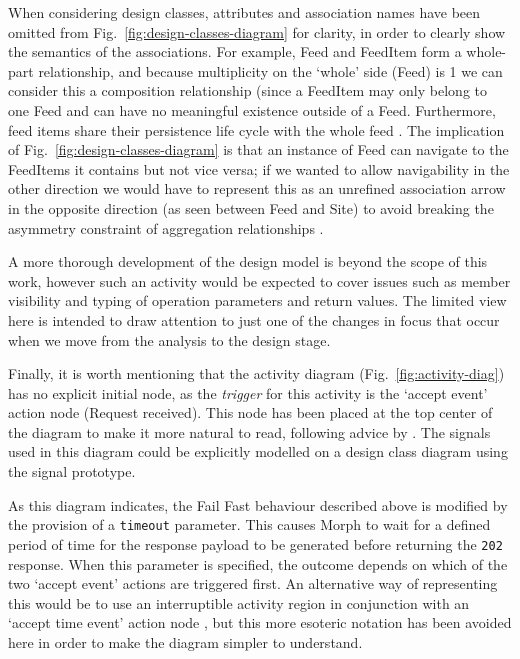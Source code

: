 \documentclass[runningheads,a4paper]{llncs}
\begin{document}
When considering design classes, attributes and association names have been omitted from Fig.~\ref{fig:design-classes-diagram} for clarity, in order to clearly show the semantics of the associations. For example, \textsf{Feed} and \textsf{FeedItem} form a whole-part relationship, and because multiplicity on the `whole' side (\textsf{Feed}) is 1 we can consider this a composition relationship (since a \textsf{FeedItem} may only belong to one \textsf{Feed} and can have no meaningful existence outside of a \textsf{Feed}. Furthermore, feed items share their persistence life cycle with the whole feed \cite{ambler}. The implication of Fig.~\ref{fig:design-classes-diagram} is that an instance of \textsf{Feed} can navigate to the \textsf{FeedItem}s it contains but not vice versa; if we wanted to allow navigability in the other direction we would have to represent this as an unrefined association arrow in the opposite direction (as seen between \textsf{Feed} and \textsf{Site}) to avoid breaking the asymmetry constraint of aggregation relationships \cite{arlow}.

A more thorough development of the design model is beyond the scope of this work, however such an activity would be expected to cover issues such as member visibility and typing of operation parameters and return values. The limited view here is intended to draw attention to just one of the changes in focus that occur when we move from the analysis to the design stage.

Finally, it is worth mentioning that the activity diagram (Fig.~\ref{fig:activity-diag}) has no explicit initial node, as the \textit{trigger} for this activity is the `accept event' action node (\textsf{Request received}). This node has been placed at the top center of the diagram to make it more natural to read, following advice by \cite{ambler}. The signals used in this diagram could be explicitly modelled on a design class diagram using the \textsf{signal} prototype.

As this diagram indicates, the Fail Fast behaviour described above is modified by the provision of a \texttt{timeout} parameter. This causes Morph to wait for a defined period of time for the response payload to be generated before returning the \texttt{202} response. When this parameter is specified, the outcome depends on which of the two `accept event' actions are triggered first. An alternative way of representing this would be to use an interruptible activity region in conjunction with an `accept time event' action node \cite{arlow}, but this more esoteric notation has been avoided here in order to make the diagram simpler to understand.
\end{document}
